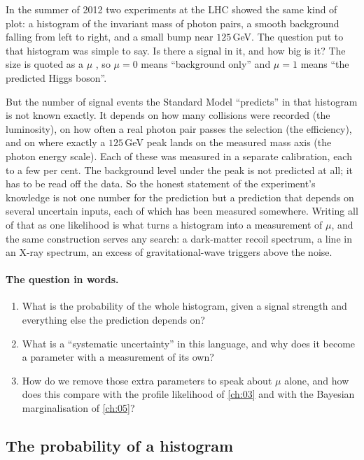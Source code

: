 In the summer of 2012 two experiments at the LHC showed the same kind of plot: a
histogram of the invariant mass of photon pairs, a smooth background falling from
left to right, and a small bump near $125\,$GeV. The question put to that histogram
was simple to say. Is there a signal in it, and how big is it? The size is quoted
as a  $\mu$ , so $\mu=0$ means ``background
only'' and $\mu=1$ means ``the predicted Higgs boson''.

But the number of signal events the Standard Model ``predicts'' in that histogram is
not known exactly. It depends on how many collisions were recorded (the luminosity),
on how often a real photon pair passes the selection (the efficiency), and on where
exactly a $125\,$GeV peak lands on the measured mass axis (the photon energy scale).
Each of these was measured in a separate calibration, each to a few per cent. The
background level under the peak is not predicted at all; it has to be read off the
data. So the honest statement of the experiment's knowledge is not one number for
the prediction but a prediction that depends on several uncertain inputs, each of
which has been measured somewhere. Writing all of that as one likelihood is what
turns a histogram into a measurement of $\mu$, and the same construction serves
any search: a dark-matter recoil spectrum, a line in an X-ray spectrum, an excess of
gravitational-wave triggers above the noise.

\paragraph{The question in words.}
\begin{enumerate}[label=\arabic*.]
  \item What is the probability of the whole histogram, given a signal strength and
        everything else the prediction depends on?
  \item What is a ``systematic uncertainty'' in this language, and why does it
        become a parameter with a measurement of its own?
  \item How do we remove those extra parameters to speak about $\mu$ alone, and how
        does this compare with the profile likelihood of \cref{ch:03} and with the
        Bayesian marginalisation of \cref{ch:05}?
\end{enumerate}

\subsection{The probability of a histogram}
\label{4b:sec:binned-like}

